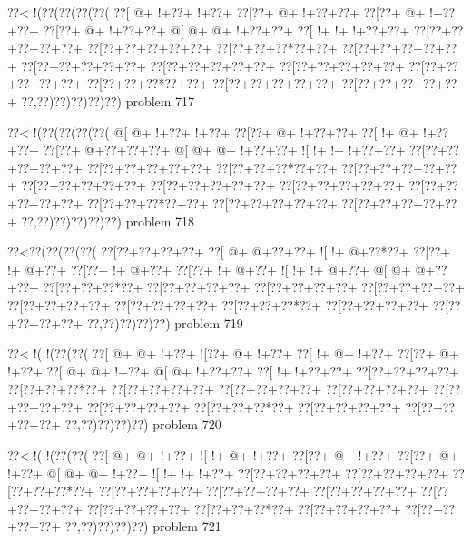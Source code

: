 \vbox{\vbox{\goo
\0??<\- !(\0??(\0??(\0??(\0??(
\0??[\- @+\- !+\0??+\- !+\0??+
\0??[\0??+\- @+\- !+\0??+\0??+
\0??[\0??+\- @+\- !+\0??+\0??+
\0??[\0??+\- @+\- !+\0??+\0??+
\- @[\- @+\- @+\- !+\0??+\0??+
\0??[\- !+\- !+\- !+\0??+\0??+
\0??[\0??+\0??+\0??+\0??+\0??+
\0??[\0??+\0??+\0??+\0??+\0??+
\0??[\0??+\0??+\0??*\0??+\0??+
\0??[\0??+\0??+\0??+\0??+\0??+
\0??[\0??+\0??+\0??+\0??+\0??+
\0??[\0??+\0??+\0??+\0??+\0??+
\0??[\0??+\0??+\0??+\0??+\0??+
\0??[\0??+\0??+\0??+\0??+\0??+
\0??[\0??+\0??+\0??*\0??+\0??+
\0??[\0??+\0??+\0??+\0??+\0??+
\0??[\0??+\0??+\0??+\0??+\0??+
\0??,\0??)\0??)\0??)\0??)\0??)
}
\hfil problem 717\hfil\break
}

\vbox{\vbox{\goo
\0??<\- !(\0??(\0??(\0??(\0??(
\- @[\- @+\- !+\0??+\- !+\0??+
\0??[\0??+\- @+\- !+\0??+\0??+
\0??[\- !+\- @+\- !+\0??+\0??+
\0??[\0??+\- @+\0??+\0??+\0??+
\- @[\- @+\- @+\- !+\0??+\0??+
\- ![\- !+\- !+\- !+\0??+\0??+
\0??[\0??+\0??+\0??+\0??+\0??+
\0??[\0??+\0??+\0??+\0??+\0??+
\0??[\0??+\0??+\0??*\0??+\0??+
\0??[\0??+\0??+\0??+\0??+\0??+
\0??[\0??+\0??+\0??+\0??+\0??+
\0??[\0??+\0??+\0??+\0??+\0??+
\0??[\0??+\0??+\0??+\0??+\0??+
\0??[\0??+\0??+\0??+\0??+\0??+
\0??[\0??+\0??+\0??*\0??+\0??+
\0??[\0??+\0??+\0??+\0??+\0??+
\0??[\0??+\0??+\0??+\0??+\0??+
\0??,\0??)\0??)\0??)\0??)\0??)
}
\hfil problem 718\hfil\break
}

\vbox{\vbox{\goo
\0??<\0??(\0??(\0??(\0??(
\0??[\0??+\0??+\0??+\0??+
\0??[\- @+\- @+\0??+\0??+
\- ![\- !+\- @+\0??*\0??+
\0??[\0??+\- !+\- @+\0??+
\0??[\0??+\- !+\- @+\0??+
\0??[\0??+\- !+\- @+\0??+
\- ![\- !+\- !+\- @+\0??+
\- @[\- @+\- @+\0??+\0??+
\0??[\0??+\0??+\0??*\0??+
\0??[\0??+\0??+\0??+\0??+
\0??[\0??+\0??+\0??+\0??+
\0??[\0??+\0??+\0??+\0??+
\0??[\0??+\0??+\0??+\0??+
\0??[\0??+\0??+\0??+\0??+
\0??[\0??+\0??+\0??*\0??+
\0??[\0??+\0??+\0??+\0??+
\0??[\0??+\0??+\0??+\0??+
\0??,\0??)\0??)\0??)\0??)
}
\hfil problem 719\hfil\break
}

\vbox{\vbox{\goo
\0??<\- !(\- !(\0??(\0??(
\0??[\- @+\- @+\- !+\0??+
\- ![\0??+\- @+\- !+\0??+
\0??[\- !+\- @+\- !+\0??+
\0??[\0??+\- @+\- !+\0??+
\0??[\- @+\- @+\- !+\0??+
\- @[\- @+\- !+\0??+\0??+
\0??[\- !+\- !+\0??+\0??+
\0??[\0??+\0??+\0??+\0??+
\0??[\0??+\0??+\0??*\0??+
\0??[\0??+\0??+\0??+\0??+
\0??[\0??+\0??+\0??+\0??+
\0??[\0??+\0??+\0??+\0??+
\0??[\0??+\0??+\0??+\0??+
\0??[\0??+\0??+\0??+\0??+
\0??[\0??+\0??+\0??*\0??+
\0??[\0??+\0??+\0??+\0??+
\0??[\0??+\0??+\0??+\0??+
\0??,\0??)\0??)\0??)\0??)
}
\hfil problem 720\hfil\break
}

\vbox{\vbox{\goo
\0??<\- !(\- !(\0??(\0??(
\0??[\- @+\- @+\- !+\0??+
\- ![\- !+\- @+\- !+\0??+
\0??[\0??+\- @+\- !+\0??+
\0??[\0??+\- @+\- !+\0??+
\- @[\- @+\- @+\- !+\0??+
\- ![\- !+\- !+\- !+\0??+
\0??[\0??+\0??+\0??+\0??+
\0??[\0??+\0??+\0??+\0??+
\0??[\0??+\0??+\0??*\0??+
\0??[\0??+\0??+\0??+\0??+
\0??[\0??+\0??+\0??+\0??+
\0??[\0??+\0??+\0??+\0??+
\0??[\0??+\0??+\0??+\0??+
\0??[\0??+\0??+\0??+\0??+
\0??[\0??+\0??+\0??*\0??+
\0??[\0??+\0??+\0??+\0??+
\0??[\0??+\0??+\0??+\0??+
\0??,\0??)\0??)\0??)\0??)
}
\hfil problem 721\hfil\break
}

